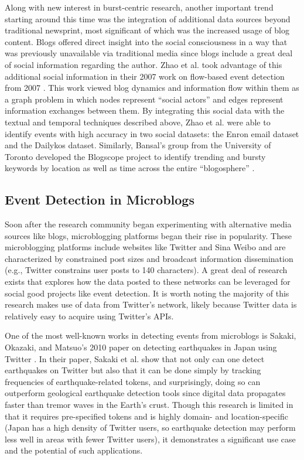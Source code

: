 \documentclass{acm_proc_article-sp}
\begin{document}
Along with new interest in burst-centric research, another important trend starting around this time was the integration of additional data sources beyond traditional newsprint, most significant of which was the increased usage of blog content.
Blogs offered direct insight into the social consciousness in a way that was previously unavailable via traditional media since blogs include a great deal of social information regarding the author.
Zhao et al. took advantage of this additional social information in their 2007 work on flow-based event detection from 2007 \cite{Zhao2007}.
This work viewed blog dynamics and information flow within them as a graph problem in which nodes represent ``social actors'' and edges represent information exchanges between them.
By integrating this social data with the textual and temporal techniques described above, Zhao et al. were able to identify events with high accuracy in two social datasets: the Enron email dataset and the Dailykos dataset.
Similarly, Bansal's group from the University of Toronto developed the Blogscope project to identify trending and bursty keywords by location as well as time across the entire ``blogosphere'' \cite{Bansal:2007:BSO:1325851.1326028,Bansal:2007:BSA:1242572.1242802}.

\subsection{Event Detection in Microblogs}

Soon after the research community began experimenting with alternative media sources like blogs, microblogging platforms began their rise in popularity.
These microblogging platforms include websites like Twitter and Sina Weibo and are characterized by constrained post sizes and broadcast information dissemination (e.g., Twitter constrains user posts to 140 characters).
A great deal of research exists that explores how the data posted to these networks can be leveraged for social good projects like event detection.
It is worth noting the majority of this research makes use of data from Twitter's network, likely because Twitter data is relatively easy to acquire using Twitter's APIs.

One of the most well-known works in detecting events from microblogs is Sakaki, Okazaki, and Matsuo's 2010 paper on detecting earthquakes in Japan using Twitter \cite{Sakaki:2010:EST:1772690.1772777}.
In their paper, Sakaki et al. show that not only can one detect earthquakes on Twitter but also that it can be done simply by tracking frequencies of earthquake-related tokens, and surprisingly, doing so can outperform geological earthquake detection tools since digital data propagates faster than tremor waves in the Earth's crust.
Though this research is limited in that it requires pre-specified tokens and is highly domain- and location-specific (Japan has a high density of Twitter users, so earthquake detection may perform less well in areas with fewer Twitter users), it demonstrates a significant use case and the potential of such applications.
\end{document}
